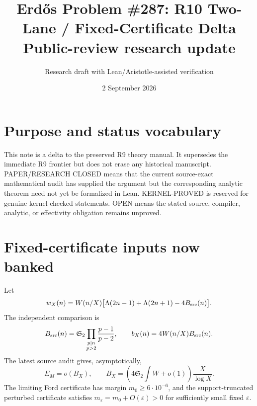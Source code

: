 \documentclass[11pt]{article}
\title{\textbf{Erd\H{o}s Problem \#287: R10 Two-Lane / Fixed-Certificate Delta}\\\large Public-review research update}
\author{Research draft with Lean/Aristotle-assisted verification}
\date{2 September 2026}
\newcommand{\1}{\mathbf 1}
\newcommand{\status}[1]{\textsf{#1}}
\begin{document}
\maketitle

\begin{center}
\end{center}

\section{Purpose and status vocabulary}
This note is a delta to the preserved R9 theory manual. It supersedes the immediate R9 frontier but does not erase any historical manuscript. \status{PAPER/RESEARCH CLOSED} means that the current source-exact mathematical audit has supplied the argument but the corresponding analytic theorem need not yet be formalized in Lean. \status{KERNEL-PROVED} is reserved for genuine kernel-checked statements. \status{OPEN} means the stated source, compiler, analytic, or effectivity obligation remains unproved.

\section{Fixed-certificate inputs now banked}
Let
\[
 w_X(n)=W(n/X)\bigl[\Lambda(2n-1)+\Lambda(2n+1)-4B_{\rm src}(n)\bigr].
\]
The independent comparison is
\[
 B_{\rm src}(n)=\mathfrak S_2\prod_{\substack{p\mid n\\p>2}}\frac{p-1}{p-2},
 \qquad b_X(n)=4W(n/X)B_{\rm src}(n).
\]
The latest source audit gives, asymptotically,
\[
 E_M=o(B_X),\qquad
 B_X=\left(4\mathfrak S_2\int W+o(1)\right)\frac{X}{\log X}.
\]
The limiting Ford certificate has margin $m_0\ge6\cdot10^{-6}$, and the support-truncated perturbed certificate satisfies $m_\varepsilon=m_0+O(\varepsilon)>0$ for sufficiently small fixed $\varepsilon$.
\end{document}
